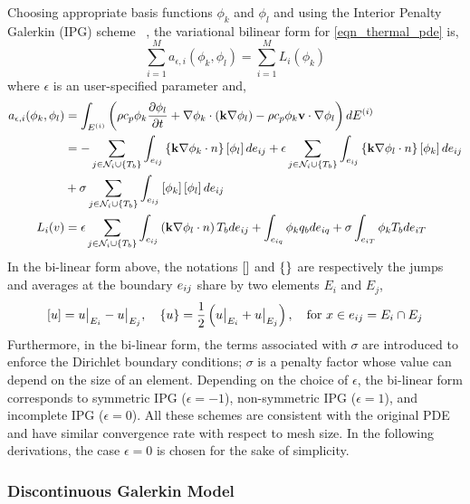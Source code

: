 Choosing appropriate basis functions $\phi_k$ and $\phi_l$ and using the Interior Penalty Galerkin (IPG) scheme ~\cite{Cohen and pernet 2018}, the variational bilinear form for \cref{eqn_thermal_pde} is,
\begin{equation}
    \sum_{i=1}^{M}a_{\epsilon,i}(\phi_k,\phi_l) = \sum_{i=1}^{M}L_i(\phi_k)
\end{equation}
where $\epsilon$ is an user-specified parameter and,
\begin{subequations}
    \begin{align}
        a_{\epsilon,i}(\phi_k,\phi_l) &= \int_{E^{(i)}}\left(\rho c_p \phi_k \frac{\partial \phi_l}{\partial t} + \nabla \phi_k\cdot\left(\mathbf{k}\nabla \phi_l\right) - \rho c_p \phi_k \mathbf{v}\cdot\nabla\phi_l\right)dE^{(i)}\\
        &= -\sum_{j\in\mathcal{N}_i\cup\left\{T_b\right\}}\int_{e_{ij}}\left\{\mathbf{k}\nabla\phi_k\cdot n\right\}\left[\phi_l\right]de_{ij} + \epsilon\sum_{j\in\mathcal{N}_i\cup\left\{T_b\right\}}\int_{e_{ij}}\left\{\mathbf{k}\nabla\phi_l\cdot n\right\}\left[\phi_k\right]de_{ij} \notag\\
        &+ \sigma\sum_{j\in\mathcal{N}_i\cup\left\{T_b\right\}}\int_{e_{ij}}\left[\phi_k\right]\left[\phi_l\right]de_{ij}\\
        L_i(v) &= \epsilon\sum_{j\in\mathcal{N}_i\cup\left\{T_b\right\}}\int_{e_{ij}}\left(\mathbf{k}\nabla\phi_l\cdot n\right)T_b de_{ij} + \int_{e_{iq}}\phi_k q_b de_{iq} + \sigma\int_{e_{iT}}\phi_k T_b de_{iT}
    \end{align}
\end{subequations}
In the bi-linear form above, the notations $\left[\right]$ and $\left\{\right\}$ are respectively the jumps and averages at the boundary $e_{ij}$ share by two elements $E_i$ and $E_j$,
\[
    \left[u\right] = u\big|_{E_i} - u\big|_{E_j},\quad \left\{u\right\} = \frac{1}{2}\left(u\big|_{E_i} + u\big|_{E_j}\right), \quad \text{for } x\in e_{ij} = E_i\cap E_j
\]
Furthermore, in the bi-linear form, the terms associated with $\sigma$ are introduced to enforce the Dirichlet boundary conditions; $\sigma$ is a penalty factor whose value can depend on the size of an element. Depending on the choice of $\epsilon$, the bi-linear form corresponds to symmetric IPG ($\epsilon=-1$), non-symmetric IPG ($\epsilon=1$), and incomplete IPG ($\epsilon=0$). All these schemes are consistent with the original PDE and have similar convergence rate with respect to mesh size. In the following derivations, the case $\epsilon=0$ is chosen for the sake of simplicity.

\subsubsection{Discontinuous Galerkin Model}

